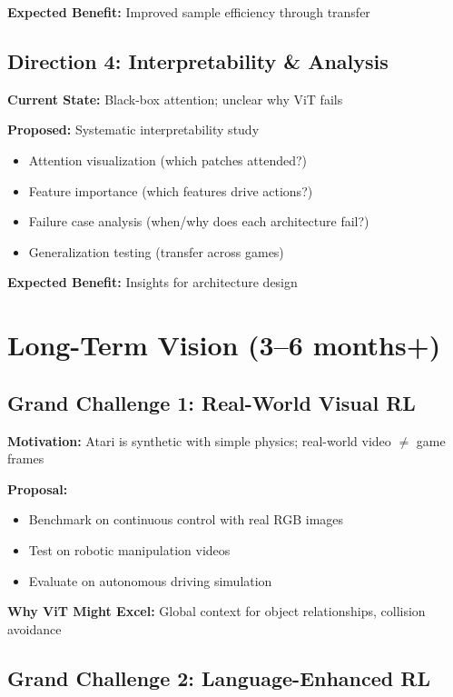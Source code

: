 \documentclass[12pt,a4paper,openany]{report}
\begin{document}
\textbf{Expected Benefit:} Improved sample efficiency through transfer

\subsection{Direction 4: Interpretability \& Analysis}

\textbf{Current State:} Black-box attention; unclear why ViT fails

\textbf{Proposed:} Systematic interpretability study

\begin{itemize}
    \item Attention visualization (which patches attended?)
    \item Feature importance (which features drive actions?)
    \item Failure case analysis (when/why does each architecture fail?)
    \item Generalization testing (transfer across games)
\end{itemize}

\textbf{Expected Benefit:} Insights for architecture design

\section{Long-Term Vision (3--6 months+)}

\subsection{Grand Challenge 1: Real-World Visual RL}

\textbf{Motivation:} Atari is synthetic with simple physics; real-world video $\neq$ game frames

\textbf{Proposal:}
\begin{itemize}
    \item Benchmark on continuous control with real RGB images
    \item Test on robotic manipulation videos
    \item Evaluate on autonomous driving simulation
\end{itemize}

\textbf{Why ViT Might Excel:} Global context for object relationships, collision avoidance

\subsection{Grand Challenge 2: Language-Enhanced RL}
\end{document}
